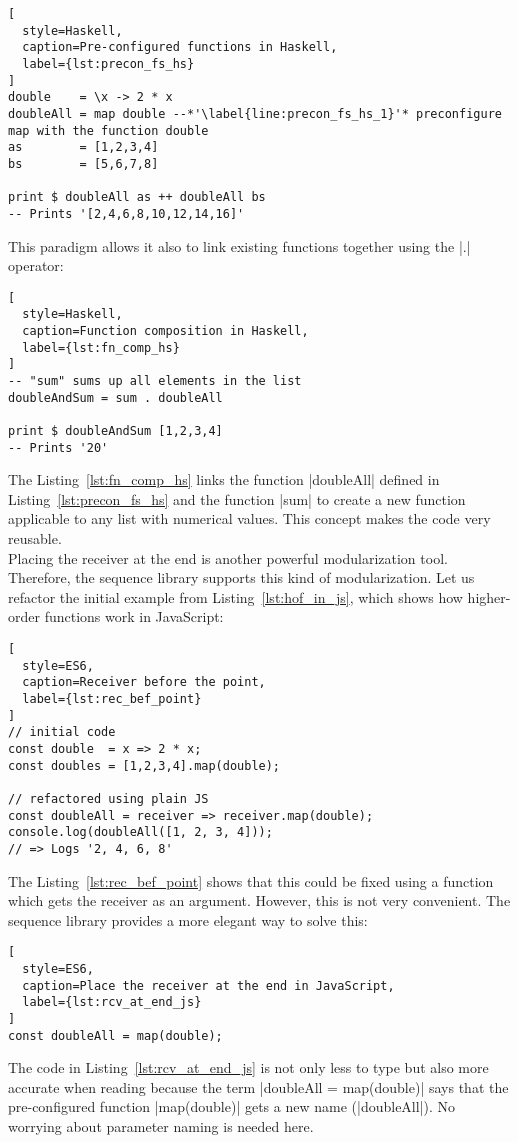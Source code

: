 \begin{lstlisting}[
  style=Haskell,
  caption=Pre-configured functions in Haskell,
  label={lst:precon_fs_hs}
]
double    = \x -> 2 * x
doubleAll = map double --*'\label{line:precon_fs_hs_1}'* preconfigure map with the function double
as        = [1,2,3,4]
bs        = [5,6,7,8]

print $ doubleAll as ++ doubleAll bs
-- Prints '[2,4,6,8,10,12,14,16]'
\end{lstlisting}

This paradigm allows it also to link existing functions together using the |.|
operator:

\begin{lstlisting}[
  style=Haskell,
  caption=Function composition in Haskell,
  label={lst:fn_comp_hs}
]
-- "sum" sums up all elements in the list
doubleAndSum = sum . doubleAll

print $ doubleAndSum [1,2,3,4]
-- Prints '20'
\end{lstlisting}

The Listing~\ref{lst:fn_comp_hs} links the function |doubleAll| defined in
Listing~\ref{lst:precon_fs_hs} and the function |sum| to create a new function
applicable to any list with numerical values. This concept makes the code very
reusable.\\
Placing the receiver at the end is another powerful modularization
tool. Therefore, the sequence library supports this kind of modularization.
Let us refactor the initial example from Listing~\ref{lst:hof_in_js}, which 
shows how higher-order functions work in JavaScript:
\begin{lstlisting}[
  style=ES6,
  caption=Receiver before the point,
  label={lst:rec_bef_point}
]
// initial code
const double  = x => 2 * x;
const doubles = [1,2,3,4].map(double);

// refactored using plain JS
const doubleAll = receiver => receiver.map(double);
console.log(doubleAll([1, 2, 3, 4]));
// => Logs '2, 4, 6, 8'
\end{lstlisting}

The Listing~\ref{lst:rec_bef_point} shows that this could be fixed using a
function which gets the receiver as an argument. However, this is not very
convenient. The sequence library provides a more elegant way to solve this:

\begin{lstlisting}[
  style=ES6,
  caption=Place the receiver at the end in JavaScript,
  label={lst:rcv_at_end_js}
]
const doubleAll = map(double);
\end{lstlisting}

The code in Listing~\ref{lst:rcv_at_end_js} is not only less to type but also
more accurate when reading because the term |doubleAll = map(double)| says that
the pre-configured function |map(double)| gets a new name (|doubleAll|). No worrying about
parameter naming is needed here.
